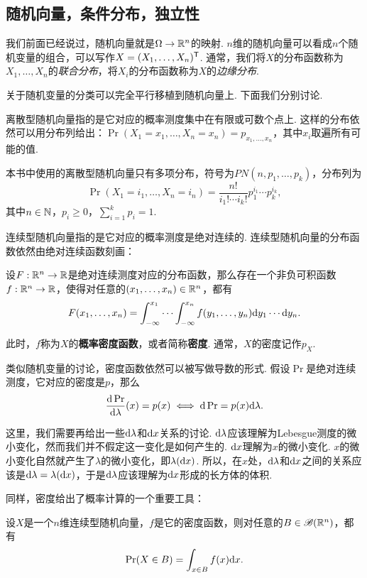 \subsection{随机向量，条件分布，独立性}\label{subsec:random-vector}

我们前面已经说过，随机向量就是$\Omega\to\mathbb{R}^n$的映射. $n$维的随机向量可以看成$n$个随机变量的组合，可以写作$X=(X_1,\dots,X_n)^{\mathsf{T}}$. 通常，我们将$X$的分布函数称为$X_1,\dots,X_n$的\emph{联合分布}，将$X_i$的分布函数称为$X$的\emph{边缘分布}.

关于随机变量的分类可以完全平行移植到随机向量上. 下面我们分别讨论. 

离散型随机向量指的是它对应的概率测度集中在有限或可数个点上. 这样的分布依然可以用分布列给出：$\Pr(X_1=x_1,\dots,X_n=x_n)=p_{x_1,\dots,x_n}$，其中$x_i$取遍所有可能的值. 

本书中使用的离散型随机向量只有多项分布，符号为$PN(n,p_1,\dots,p_k)$，分布列为
\[\Pr(X_1=i_1,\dots,X_n=i_n)=\frac{n!}{i_1!\cdots i_k!}p_1^{i_1}\cdots p_k^{i_k},\]
其中$n\in\mathbb{N}$，$p_i\geq 0$，$\sum_{i=1}^k p_i=1$. 

连续型随机向量指的是它对应的概率测度是绝对连续的. 连续型随机向量的分布函数依然由绝对连续函数刻画：

\begin{theorem}\label{thm:continuous-vector}
设$F:\mathbb{R}^n\to\mathbb{R}$是绝对连续测度对应的分布函数，那么存在一个非负可积函数$f:\mathbb{R}^n\to\mathbb{R}$，使得对任意的$(x_1,\dots,x_n)\in\mathbb{R}^n$，都有
\[F(x_1,\dots,x_n)=\int_{-\infty}^{x_1}\cdots\int_{-\infty}^{x_n}f(y_1,\dots,y_n)\mathrm{d} y_1\cdots\mathrm{d} y_n.\]
\end{theorem}

此时，$f$称为$X$的\textbf{概率密度函数}，或者简称\textbf{密度}. 通常，$X$的密度记作$p_X$.

类似随机变量的讨论，密度函数依然可以被写做导数的形式. 假设$\Pr$是绝对连续测度，它对应的密度是$p$，那么
\[\frac{\mathrm{d}\Pr}{\mathrm{d}\lambda}(x)=p(x)\iff \mathrm{d}\Pr=p(x)\mathrm{d}\lambda.\]

这里，我们需要再给出一些$\mathrm{d}\lambda$和$\mathrm{d} x$关系的讨论. $\mathrm{d}\lambda$应该理解为Lebesgue测度的微小变化，然而我们并不假定这一变化是如何产生的. $\mathrm{d} x$理解为$x$的微小变化. $x$的微小变化自然就产生了$\lambda$的微小变化，即$\lambda(\mathrm{d} x)$. 所以，在$x$处，$\mathrm{d}\lambda$和$\mathrm{d} x$之间的关系应该是$\mathrm{d}\lambda=\lambda(\mathrm{d} x)$，于是$\mathrm{d}\lambda$应该理解为$\mathrm{d} x$形成的长方体的体积. 

同样，密度给出了概率计算的一个重要工具：
\begin{proposition}\label{prop:continuous-prob-vec}
    设$X$是一个$n$维连续型随机向量，$f$是它的密度函数，则对任意的$B\in\mathscr{B}(\mathbb{R}^n)$，都有
    \[\Pr(X\in B)=\int_{x\in B}f(x)\mathrm{d} x.\]
\end{proposition}


